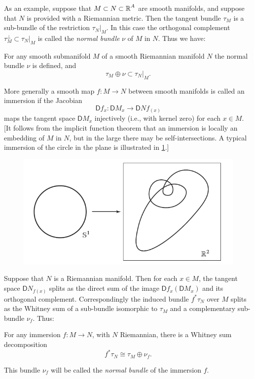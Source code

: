 As an example, suppose that $M\subset N\subset \boldsymbol{\mathbb{R}}^A$ are smooth manifolds, and
suppose that $N$ is provided with a Riemannian metric. Then the tangent
bundle $\tau_M$ is a sub-bundle of the restriction $\tau_N|_M$. In this case the
orthogonal complement $\tau_M^\perp\subset\tau_N|_M$ is called the \textit{normal bundle} $\nu$ of $M$
in $N$. Thus we have:

\begin{corollary}
	For any smooth submanifold $M$ of a smooth
	Riemannian manifold $N$ the normal bundle $\nu$ is defined, and
	\[\tau_M\oplus\nu\subset\tau_N|_M. \]
\end{corollary}


More generally a smooth map $f \mathpunct{:} M \to N$ between smooth manifolds is
called an immersion if the Jacobian
\[\mathsf{D}f_x\mathpunct{:} \mathsf{D}M_x\longrightarrow \mathsf{D}Nf_{(x)}\]
maps the tangent space $\mathsf{D}M_x$ injectively (i.e., with kernel zero) for each
$x\in M$. [It follows from the implicit function theorem that an immersion is
locally an embedding of $M$ in $N$, but in the large there may be self-intersections. A typical immersion of the circle in the plane is illustrated in \cref{fig4}.]

\begin{figure}[!htb]
	\centering\includegraphics[scale=.6]{fig4}
	\caption{}\label{fig4}
\end{figure}

Suppose that $N$ is a Riemannian manifold. Then for each $x\in M$, the
tangent space $\mathsf{D}N_{f(x)}$ splits as the direct sum of the image $\mathsf{D}f_x(\mathsf{D}M_x)$
and its orthogonal complement. Correspondingly the induced bundle $f^*\tau_N$
over $M$ splits as the Whitney sum of a sub-bundle isomorphic to $\tau_M$ and
a complementary sub-bundle $\nu_f$. Thus:

\begin{corollary}\label{cor-3-5}
	For any immersion $f \mathpunct{:} M\to
	N$, with $N$
	Riemannian, there is a Whitney sum decomposition
	\[f^*\tau_N\cong \tau_M\oplus\nu_f.\]
\end{corollary}
This bundle $\nu_f$ will be called the \textit{normal bundle} of the immersion $f$.

